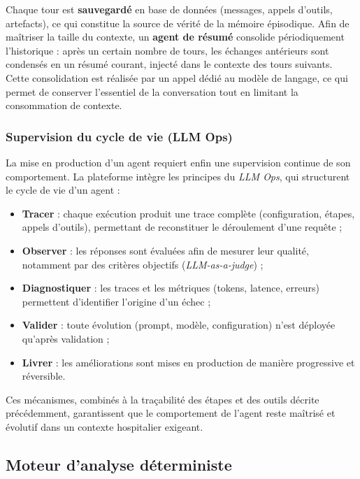 Chaque tour est \textbf{sauvegardé} en base de données (messages, appels d'outils, artefacts), ce qui constitue la source de vérité de la mémoire épisodique. Afin de maîtriser la taille du contexte, un \textbf{agent de résumé} consolide périodiquement l'historique : après un certain nombre de tours, les échanges antérieurs sont condensés en un résumé courant, injecté dans le contexte des tours suivants. Cette consolidation est réalisée par un appel dédié au modèle de langage, ce qui permet de conserver l'essentiel de la conversation tout en limitant la consommation de contexte.

\subsubsection{Supervision du cycle de vie (LLM Ops)}

La mise en production d'un agent requiert enfin une supervision continue de son comportement. La plateforme intègre les principes du \textit{LLM Ops}, qui structurent le cycle de vie d'un agent :

\begin{itemize}
  \item \textbf{Tracer} : chaque exécution produit une trace complète (configuration, étapes, appels d'outils), permettant de reconstituer le déroulement d'une requête ;
  \item \textbf{Observer} : les réponses sont évaluées afin de mesurer leur qualité, notamment par des critères objectifs (\textit{LLM-as-a-judge}) ;
  \item \textbf{Diagnostiquer} : les traces et les métriques (tokens, latence, erreurs) permettent d'identifier l'origine d'un échec ;
  \item \textbf{Valider} : toute évolution (prompt, modèle, configuration) n'est déployée qu'après validation ;
  \item \textbf{Livrer} : les améliorations sont mises en production de manière progressive et réversible.
\end{itemize}

Ces mécanismes, combinés à la traçabilité des étapes et des outils décrite précédemment, garantissent que le comportement de l'agent reste maîtrisé et évolutif dans un contexte hospitalier exigeant.

\subsection{Moteur d'analyse déterministe}

